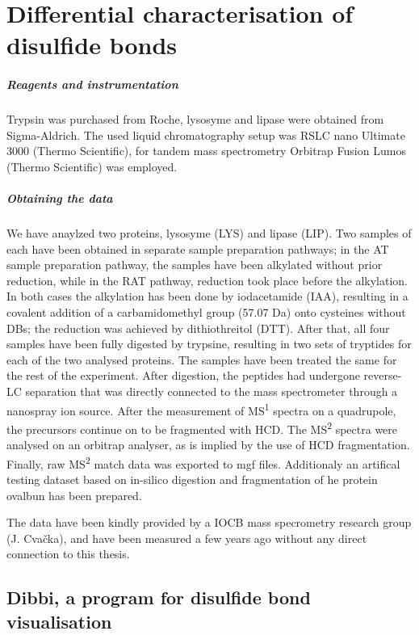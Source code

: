 \chapter{Differential characterisation of disulfide bonds}\label{chap:methods}

\paragraph{Reagents and instrumentation} Trypsin was purchased from Roche, lysosyme and lipase were obtained from Sigma-Aldrich. The used liquid chromatography setup was RSLC nano Ultimate 3000 (Thermo Scientific), for tandem mass spectrometry Orbitrap Fusion Lumos (Thermo Scientific) was employed.

\paragraph{Obtaining the data} We have anaylzed two proteins, lysosyme (LYS) and lipase (LIP). Two samples of each have been obtained in separate sample preparation pathways; in the AT sample preparation pathway, the samples have been alkylated without prior reduction, while in the RAT pathway, reduction took place before the alkylation. In both cases the alkylation has been done by iodacetamide (IAA), resulting in a covalent addition of a carbamidomethyl group (57.07 Da) onto cysteines without DBs; the reduction was achieved by dithiothreitol (DTT). After that, all four samples have been fully digested by trypsine, resulting in two sets of tryptides for each of the two analysed proteins. The samples have been treated the same for the rest of the experiment. After digestion, the peptides had undergone reverse-LC separation that was directly connected to the mass spectrometer through a nanospray ion source. After the measurement of MS\textsuperscript{1} spectra on a quadrupole, the precursors continue on to be fragmented with HCD\@. The MS\textsuperscript{2} spectra were analysed on an orbitrap analyser, as is implied by the use of HCD fragmentation. Finally, raw MS\textsuperscript{2} match data was exported to mgf files. Additionaly an artifical testing dataset based on in-silico digestion and fragmentation of he protein ovalbun has been prepared.

The data have been kindly provided by a IOCB mass specrometry research group (J. Cvačka), and have been measured a few years ago without any direct connection to this thesis.

\section{Dibbi, a program for disulfide bond visualisation}

